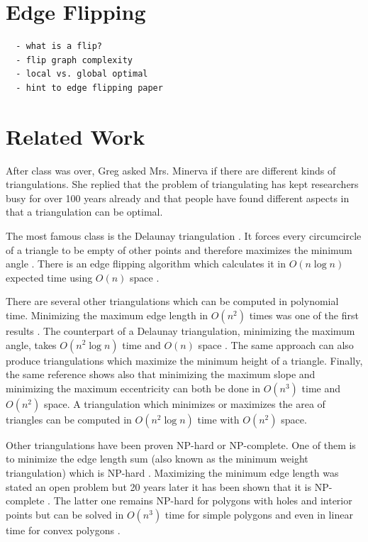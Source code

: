 
\section{Edge Flipping}
\begin{verbatim}
  - what is a flip?
  - flip graph complexity
  - local vs. global optimal
  - hint to edge flipping paper
\end{verbatim}

\section{Related Work}
After class was over, Greg asked Mrs. Minerva if there are different
kinds of triangulations. She replied that the problem of 
triangulating has kept researchers busy for over 100 years already
\cite{triangulation_hilbert} and that people have found different
aspects in that a triangulation can be optimal.

The most famous class is the Delaunay triangulation
\cite[Section 9.2]{deberg_compgeom}. It forces every circumcircle
of a triangle to be empty of other points and therefore maximizes
the minimum angle \cite[Theorem 9.9]{deberg_compgeom}. There is an
edge flipping algorithm which calculates it in \(O(n \log n)\) 
expected time using \(O(n)\) space 
\cite[Theorem 9.12]{deberg_compgeom}.

There are several other triangulations which can be computed in
polynomial time. Minimizing the maximum edge length in \(O(n^2)\)
times was one of the first results \cite{triangulation_minmax_length}.
The counterpart of a Delaunay triangulation, 
minimizing the maximum angle, takes \(O(n^2 \log n)\) time and
\(O(n)\) space \cite{triangulation_edge_insertion}. The same
approach can also produce triangulations which maximize the minimum 
height of a triangle. Finally, the same reference shows also that 
minimizing the maximum slope and minimizing the maximum eccentricity 
can both be done in \(O(n^3)\) time and \(O(n^2)\) space. A 
triangulation which minimizes or maximizes the area of triangles can
be computed in \(O(n^2 \log n)\) time with \(O(n^2)\) space.
\cite{triangulation_area}

Other triangulations have been proven NP-hard or NP-complete. One
of them is to minimize the edge length sum (also known as the minimum
weight triangulation) which is NP-hard \cite{mwt_complexity}. 
Maximizing the minimum edge length was stated an open problem
\cite{triangulation_minmax_length} but 20 years later it has been
shown that it is NP-complete \cite{mmlt_complexity}. The latter one
remains NP-hard for polygons with holes and interior points
\cite{mmlt_polygons} but can be solved in \(O(n^3)\) time for simple
polygons and even in linear time for convex polygons
\cite{mmlt_convex_polygons}.

